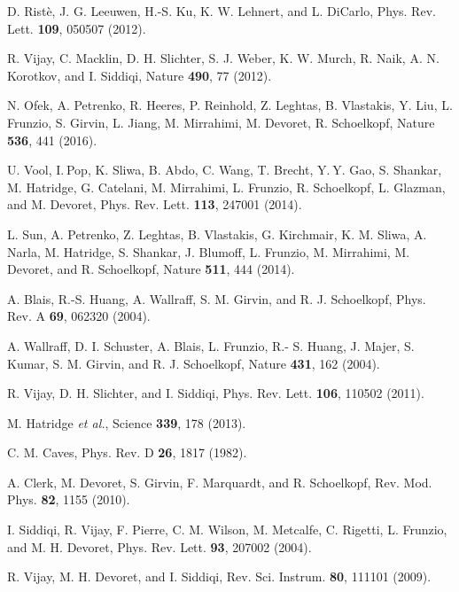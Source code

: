 \documentclass[aip,onecolumn,10pt]{revtex4}%
\begin{document}
\begin{thebibliography}{99}           
	
	 D. Rist\`{e}, J. G. Leeuwen, H.-S. Ku, K. W. Lehnert, and L. DiCarlo, Phys. Rev. Lett. \textbf{109}, 050507 (2012).
	
	R. Vijay, C. Macklin, D. H. Slichter, S. J. Weber, K. W. Murch, R. Naik, A. N. Korotkov, and I. Siddiqi, Nature \textbf{490}, 77 (2012).
	
	N. Ofek, A. Petrenko, R. Heeres, P. Reinhold, Z. Leghtas, B. Vlastakis, Y. Liu, L. Frunzio, S. Girvin, L. Jiang, M. Mirrahimi, M. Devoret, R. Schoelkopf, Nature \textbf{536}, 441 (2016).
	
	U. Vool, I. Pop, K. Sliwa, B. Abdo, C. Wang, T. Brecht, Y. Y. Gao, S. Shankar, M. Hatridge, G. Catelani, M. Mirrahimi, L. Frunzio, R. Schoelkopf, L. Glazman, and M. Devoret, Phys. Rev. Lett. \textbf{113}, 247001 (2014).
	
	L. Sun,	A. Petrenko, Z. Leghtas, B. Vlastakis, G. Kirchmair, K. M. Sliwa, A. Narla, M. Hatridge, S. Shankar, J. Blumoff, L. Frunzio, M. Mirrahimi, M. Devoret, and R. Schoelkopf, Nature \textbf{511}, 444 (2014).
	
	 A. Blais, R.-S. Huang, A. Wallraff, S. M. Girvin, and R. J. Schoelkopf, Phys. Rev. A \textbf{69}, 062320 (2004).
	
	 A. Wallraff, D. I. Schuster, A. Blais, L. Frunzio, R.- S. Huang, J. Majer, S. Kumar, S. M. Girvin, and R. J. Schoelkopf, Nature \textbf{431}, 162 (2004).
	
	R. Vijay, D. H. Slichter, and I. Siddiqi, Phys. Rev. Lett. \textbf{106}, 110502 (2011).
	
	M. Hatridge \textit{et al.}, Science \textbf{339}, 178 (2013).
	
	 C. M. Caves, Phys. Rev. D \textbf{26}, 1817 (1982).
	
	A. Clerk, M. Devoret, S. Girvin, F. Marquardt, and R. Schoelkopf, Rev. Mod. Phys. \textbf{82}, 1155 (2010).
	
	 I. Siddiqi, R. Vijay, F. Pierre, C. M. Wilson, M. Metcalfe, C. Rigetti, L. Frunzio, and M. H. Devoret, Phys. Rev. Lett. \textbf{93}, 207002 (2004).
	
	R. Vijay, M. H. Devoret, and I. Siddiqi, Rev. Sci. Instrum. \textbf{80}, 111101 (2009).
	

\end{thebibliography}
\end{document}
